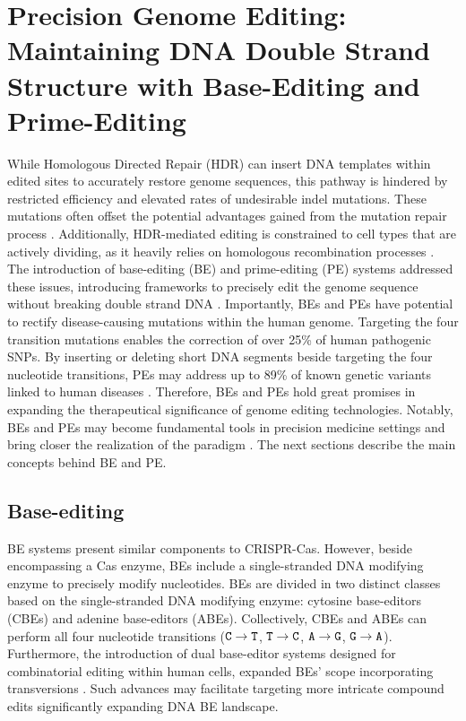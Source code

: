\documentclass[a4paper, titlepage, openright]{book}
\begin{document}
\section{Precision Genome Editing: Maintaining DNA Double Strand Structure with Base-Editing and Prime-Editing}
While Homologous Directed Repair (HDR) can insert DNA templates within edited sites to accurately restore genome sequences, this pathway is hindered by restricted efficiency and elevated rates of undesirable indel mutations. These mutations often offset the potential advantages gained from the mutation repair process \citep{kantor2020crispr}. Additionally, HDR-mediated editing is constrained to cell types that are actively dividing, as it heavily relies on homologous recombination processes \citep{bollen2018create}. The introduction of base-editing (BE) and prime-editing (PE) systems addressed these issues, introducing frameworks to precisely edit the genome sequence without breaking double strand DNA \citep{komor2017crispr,anzalone2019search}. Importantly, BEs and PEs have potential to rectify disease-causing mutations within the human genome. Targeting the four transition mutations enables the correction of over 25\% of human pathogenic SNPs. By inserting or deleting short DNA segments beside targeting the four nucleotide transitions, PEs may address up to 89\% of known genetic variants linked to human diseases \citep{komor2017crispr,anzalone2019search,kantor2020crispr}. Therefore, BEs and PEs hold great promises in expanding the therapeutical significance of genome editing technologies. Notably, BEs and PEs may become fundamental tools in precision medicine settings and bring closer the realization of the paradigm \citep{porto2020base}. The next sections describe the main concepts behind BE and PE.

\subsection{Base-editing}\label{subsection:base-editing}
BE systems present similar components to CRISPR-Cas. However, beside encompassing a Cas enzyme, BEs include a single-stranded DNA modifying enzyme to precisely modify nucleotides. BEs are divided in two distinct classes based on the single-stranded DNA modifying enzyme: cytosine base-editors (CBEs) and adenine base-editors (ABEs). Collectively, CBEs and ABEs can perform all four nucleotide transitions ($\text{\texttt{C}} \rightarrow \text{\texttt{T}}$, $\text{\texttt{T}} \rightarrow \text{\texttt{C}}$, $\text{\texttt{A}} \rightarrow \text{\texttt{G}}$, $\text{\texttt{G}} \rightarrow \text{\texttt{A}}$). Furthermore, the introduction of dual base-editor systems designed for combinatorial editing within human cells, expanded BEs' scope incorporating transversions \citep{kurt2021crispr,grunewald2020dual,sakata2020base,zhang2020dual}. Such advances may facilitate targeting more intricate compound edits significantly expanding DNA BE landscape.
\end{document}
